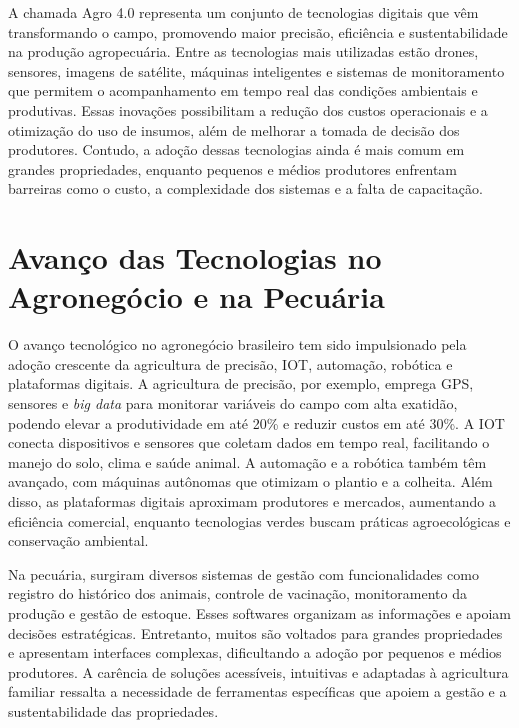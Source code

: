 A chamada Agro 4.0 representa um conjunto de tecnologias digitais que vêm transformando o campo, promovendo maior precisão, eficiência e sustentabilidade na produção agropecuária. Entre as tecnologias mais utilizadas estão drones, sensores, imagens de satélite, máquinas inteligentes e sistemas de monitoramento que permitem o acompanhamento em tempo real das condições ambientais e produtivas. Essas inovações possibilitam a redução dos custos operacionais e a otimização do uso de insumos, além de melhorar a tomada de decisão dos produtores. Contudo, a adoção dessas tecnologias ainda é mais comum em grandes propriedades, enquanto pequenos e médios produtores enfrentam barreiras como o custo, a complexidade dos sistemas e a falta de capacitação.

\section{Avanço das Tecnologias no Agronegócio e na Pecuária}
\label{sec:fundamentacao-teorica-avanço-tecnologico-agro}

O avanço tecnológico no agronegócio brasileiro tem sido impulsionado pela adoção crescente da agricultura de precisão, \gls{IOT}, automação, robótica e plataformas digitais. A agricultura de precisão, por exemplo, emprega \gls{GPS}, sensores e \textit{big data} para monitorar variáveis do campo com alta exatidão, podendo elevar a produtividade em até 20\% e reduzir custos em até 30\%. A \gls{IOT} conecta dispositivos e sensores que coletam dados em tempo real, facilitando o manejo do solo, clima e saúde animal. A automação e a robótica também têm avançado, com máquinas autônomas que otimizam o plantio e a colheita. Além disso, as plataformas digitais aproximam produtores e mercados, aumentando a eficiência comercial, enquanto tecnologias verdes buscam práticas agroecológicas e conservação ambiental.

Na pecuária, surgiram diversos sistemas de gestão com funcionalidades como registro do histórico dos animais, controle de vacinação, monitoramento da produção e gestão de estoque. Esses softwares organizam as informações e apoiam decisões estratégicas. Entretanto, muitos são voltados para grandes propriedades e apresentam interfaces complexas, dificultando a adoção por pequenos e médios produtores. A carência de soluções acessíveis, intuitivas e adaptadas à agricultura familiar ressalta a necessidade de ferramentas específicas que apoiem a gestão e a sustentabilidade das propriedades.

